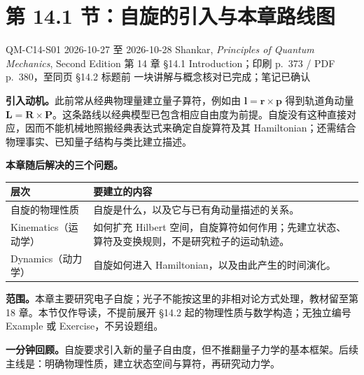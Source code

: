 \section{第 14.1 节：自旋的引入与本章路线图}
\label{section:QM-C14-S01}
\studymeta
  {QM-C14-S01}
  {2026-10-27 至 2026-10-28}
  {Shankar, \textit{Principles of Quantum Mechanics}, Second Edition}
  {第 14 章 \S 14.1 Introduction；印刷 p.~373 / PDF p.~380，至同页 \S 14.2 标题前}
  {一块讲解与概念核对已完成；笔记已确认}


\textbf{引入动机。}此前常从经典物理量建立量子算符，例如由 $\mathbf l=\mathbf r\times\mathbf p$ 得到轨道角动量 $\mathbf L=\mathbf R\times\mathbf P$。这条路线以经典模型已包含相应自由度为前提。自旋没有这种直接对应，因而不能机械地照搬经典表达式来确定自旋算符及其 Hamiltonian；还需结合物理事实、已知量子结构与类比建立描述。


\textbf{本章随后解决的三个问题。}
\begin{center}
\small
\renewcommand{\arraystretch}{1.15}
\begin{tabularx}{\textwidth}{@{}p{4.6cm}X@{}}
  \toprule
  层次 & 要建立的内容 \\
  \midrule
  自旋的物理性质 & 自旋是什么，以及它与已有角动量描述的关系。 \\
  Kinematics（运动学） & 如何扩充 Hilbert 空间，自旋算符如何作用；先建立状态、算符及变换规则，不是研究粒子的运动轨迹。 \\
  Dynamics（动力学） & 自旋如何进入 Hamiltonian，以及由此产生的时间演化。 \\
  \bottomrule
\end{tabularx}
\end{center}

\textbf{范围。}本章主要研究电子自旋；光子不能按这里的非相对论方式处理，教材留至第 18 章。本节仅作导读，不提前展开 \S 14.2 起的物理性质与数学构造；无独立编号 Example 或 Exercise，不另设题组。

\textbf{一分钟回顾。}自旋要求引入新的量子自由度，但不推翻量子力学的基本框架。后续主线是：明确物理性质，建立状态空间与算符，再研究动力学。

